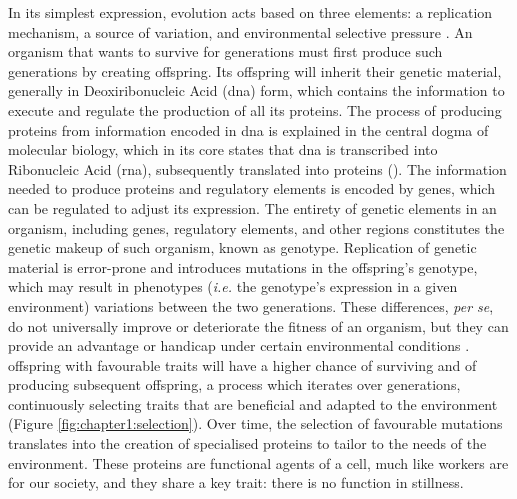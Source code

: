 In its simplest expression, evolution acts based on three elements: a replication mechanism, a source of variation, and environmental selective pressure \cite{lewontin_units_1970}. An organism that wants to survive for generations must first produce such generations by creating \gls{offspring}. Its \gls{offspring} will inherit their genetic material, generally in Deoxiribonucleic Acid (\gls{dna}) form, which contains the information to execute and regulate the production of all its proteins. The process of producing proteins from information encoded in \gls{dna} is explained in the central dogma of molecular biology, which in its core states that \gls{dna} is transcribed into Ribonucleic Acid (\gls{rna}), subsequently translated into proteins (). The information needed to produce proteins and regulatory elements is encoded by \glspl{gene}, which can be regulated to adjust its expression. The entirety of genetic elements in an organism, including \glspl{gene}, regulatory elements, and other regions constitutes the genetic makeup of such organism, known as \gls{genotype}. Replication of genetic material is error-prone and introduces mutations in the \gls{offspring}'s \gls{genotype}, which may result in \glspl{phenotype} (\textit{i.e.} the \gls{genotype}'s expression in a given environment) variations between the two generations. These differences, \textit{per se}, do not universally improve or deteriorate the fitness of an organism, but they can provide an advantage or handicap under certain environmental conditions \cite{luzzatto_sickle_2012, uyoga_sickle_2022}. \Gls{offspring} with favourable traits will have a higher chance of surviving and of producing subsequent \gls{offspring}, a process which iterates over generations, continuously selecting traits that are beneficial and adapted to the environment \cite{noauthor_natural_nodate} (Figure \ref{fig:chapter1:selection}). Over time, the selection of favourable mutations translates into the creation of specialised proteins to tailor to the needs of the environment. These proteins are functional agents of a cell, much like workers are for our society, and they share a key trait: there is no function in stillness.

